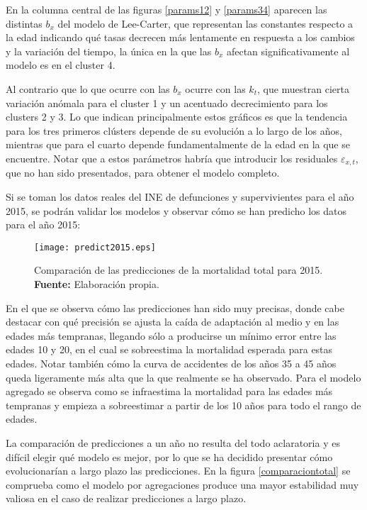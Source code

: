 \documentclass{article}
\begin{document}
\vspace{0.3cm}

En la columna central de las figuras \ref{params12} y \ref{params34} aparecen las distintas $b_{x}$ del modelo de Lee-Carter, que representan las constantes respecto a la edad indicando qué tasas decrecen más lentamente en respuesta a los cambios y la variación del tiempo, la única en la que las $b_{x}$ afectan significativamente al modelo es en el cluster 4. 

\vspace{0.3cm}

Al contrario que lo que ocurre con las $b_{x}$ ocurre con las $k_{t}$, que muestran cierta variación anómala para el cluster 1 y un acentuado decrecimiento para los clusters 2 y 3. Lo que indican principalmente estos gráficos es que la tendencia para los tres primeros clústers depende de su evolución a lo largo de los años, mientras que para el cuarto depende fundamentalmente de la edad en la que se encuentre. Notar que a estos parámetros habría que introducir los residuales $\varepsilon_{x,t}$, que no han sido presentados, para obtener el modelo completo.

Si se toman los datos reales del INE de defunciones y supervivientes para el año 2015, se podrán validar los modelos y observar cómo se han predicho los datos para el año 2015:

\begin{figure}[H]
\centering
\texttt{[image: predict2015.eps]}
\caption{\centering Comparación de las predicciones de la mortalidad total para 2015. \\ \textbf{Fuente:} Elaboración propia.}
\label{prediction2015}
\end{figure}

En el que se observa cómo las predicciones han sido muy precisas, donde cabe destacar con qué precisión se ajusta la caída de adaptación al medio y en las edades más tempranas, llegando sólo a producirse un mínimo error entre las edades 10 y 20, en el cual se sobreestima la mortalidad esperada para estas edades. Notar también cómo la curva de accidentes de los años 35 a 45 años queda ligeramente más alta que la que realmente se ha observado. Para el modelo agregado se observa como se infraestima la mortalidad para las edades más tempranas y empieza a sobreestimar a partir de los 10 años para todo el rango de edades. 

La comparación de predicciones a un año no resulta del todo aclaratoria y es difícil elegir qué modelo es mejor, por lo que se ha decidido presentar cómo evolucionarían a largo plazo las predicciones. En la figura \ref{comparaciontotal} se comprueba como el modelo por agregaciones produce una mayor estabilidad muy valiosa en el caso de realizar predicciones a largo plazo.
\end{document}
